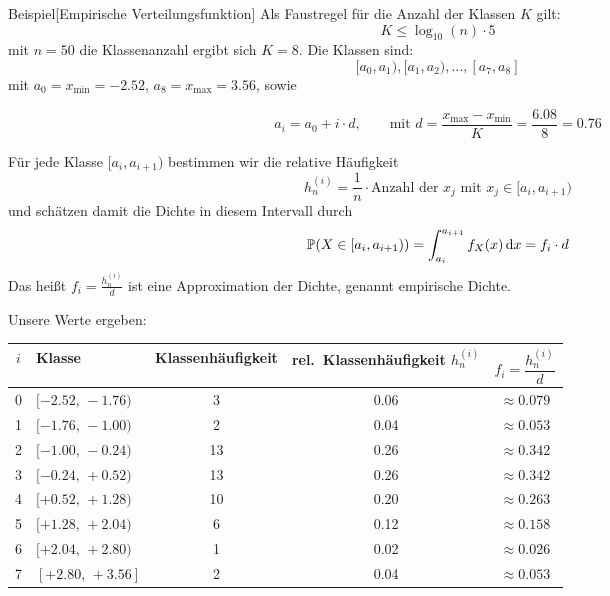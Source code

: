 \begin{colbox}{Beispiel}[Empirische Verteilungsfunktion]
    Als Faustregel für die Anzahl der Klassen $K$ gilt: 
    \[
        K \leq \log_{10}(n)\cdot 5
    \]
    mit $n=50$ die Klassenanzahl ergibt sich $K=8$. Die Klassen sind:
    \[
        [a_0, a_1), [a_1, a_2), \dots, [a_7, a_8]
    \]
    mit $a_0 = x_{\min} = -2.52$, $a_8 = x_{\max} = 3.56$, sowie 
    
    \[
        a_i = a_0 + i\cdot d, \qquad \text{mit } d = \frac{x_{\max} - x_{\min}}{K} = \frac{6.08}{8} = 0.76
    \]

    Für jede Klasse $[a_i, a_{i+1})$ bestimmen wir die relative Häufigkeit
    \[
        h_n^{(i)} = \frac{1}{n} \cdot \text{Anzahl der } x_j \text{ mit } x_j \in [a_i, a_{i+1})
    \]
    und schätzen damit die Dichte in diesem Intervall durch
    \[
        \mathbb P(X\in[a_i,a_{i+1})) = \int_{a_i}^{a_{i+1}} f_X(x)\mathop{}\!\mathrm{d} x = f_i\cdot d
    \]
    Das heißt $f_i = \tfrac{h_n^{(i)}}{d}$ ist eine Approximation der Dichte, genannt empirische Dichte. 

    Unsere Werte ergeben:
    \begin{table}[ht]
    \centering
    \begin{tabular}{c l c c c}
    \toprule
    $i$ & Klasse & Klassenhäufigkeit & rel.\ Klassenhäufigkeit $h_n^{(i)}$ & $f_i = \dfrac{h_n^{(i)}}{d}$ \\
    \midrule
    0 & $[-2.52,\,-1.76)$ &  3 & 0.06 & $\approx 0.079$ \\
    1 & $[-1.76,\,-1.00)$ &  2 & 0.04 & $\approx 0.053$ \\
    2 & $[-1.00,\,-0.24)$ & 13 & 0.26 & $\approx 0.342$ \\
    3 & $[-0.24,\,+0.52)$ & 13 & 0.26 & $\approx 0.342$ \\
    4 & $[+0.52,\,+1.28)$ & 10 & 0.20 & $\approx 0.263$ \\
    5 & $[+1.28,\,+2.04)$ &  6 & 0.12 & $\approx 0.158$ \\
    6 & $[+2.04,\,+2.80)$ &  1 & 0.02 & $\approx 0.026$ \\
    7 & $[+2.80,\,+3.56]$ &  2 & 0.04 & $\approx 0.053$ \\
    \bottomrule
    \end{tabular}
    \end{table}


\end{colbox}
